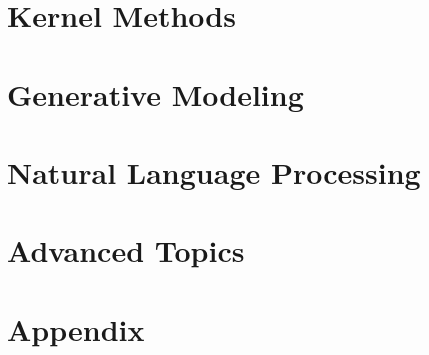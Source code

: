 \documentclass[oneside, a4paper,11pt]{book}
\begin{document}
\part{Kernel Methods}



% 
\part{Generative Modeling}






% 

\part{Natural Language Processing}

\part{Advanced Topics}

\part{Appendix}


\backmatter

\nocite{*}


\end{document}
